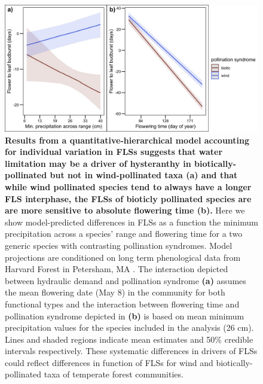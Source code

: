 \documentclass[11pt]{article}
\begin{document}
\begin{figure}[H] 
\centering
\includegraphics[height=0.4\textheight]{..//..//apcs.jpeg}
\caption{\textbf{Results from a quantitative-hierarchical model accounting for individual variation in FLSs suggests that water limitation may be a driver of hysteranthy in biotically-pollinated but not in wind-pollinated taxa (a)  and that while wind pollinated species tend to always have a longer FLS interphase, the FLSs of bioticly pollinated species are are more sensitive to absolute flowering time (b).} Here we show model-predicted differences in FLSs as a function the minimum precipitation across a species' range and flowering time for a two generic species with contrasting pollination syndromes. Model projections are conditioned on long term phenological data from Harvard Forest in Petersham, MA \citep{OKeefe2015}. The interaction depicted between hydraulic demand and pollination syndrome \textbf{(a)} assumes the mean flowering date (May 8) in the community for both functional types and the interaction between flowering time and pollination syndrome depicted in \textbf{(b)} is based on mean minimum precipitation values for the species included in the analysis (26 cm). Lines and shaded regions indicate mean estimates and 50\% credible intervals respectively. These systematic differences in drivers of FLSs could reflect differences in function of FLSs for wind and biotically-pollinated taxa of temperate forest communities.}
  \label{fig:apcs}
  \end{figure}
  
\end{document}
